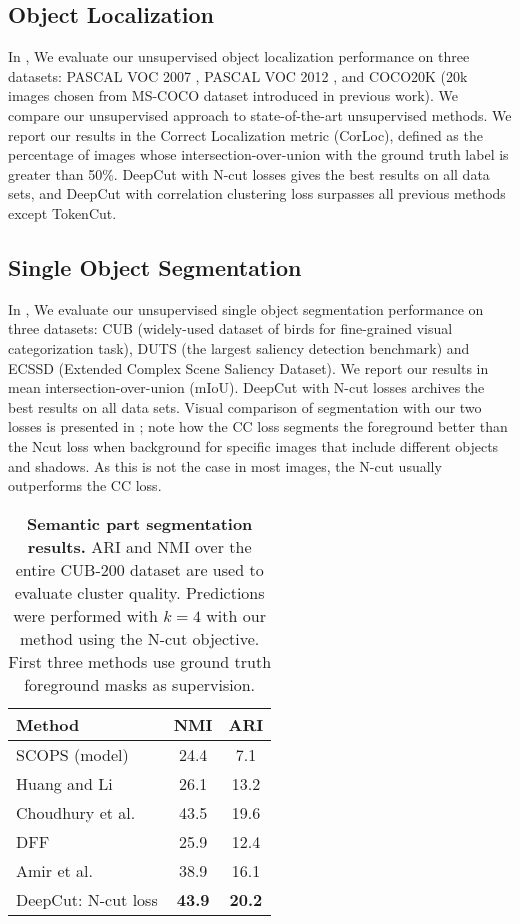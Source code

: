 \documentclass[10pt,twocolumn,letterpaper]{article}
\begin{document}
\subsection{Object Localization}
In  , We evaluate our unsupervised object localization performance on three datasets: PASCAL VOC 2007 \cite{pascal-voc-2007}, PASCAL VOC 2012 \cite{pascal-voc-2012}, 
and COCO20K (20k images chosen from MS-COCO dataset\cite{lin2014microsoft} introduced in previous work\cite{vo2020toward}).
We compare our unsupervised approach to state-of-the-art unsupervised methods.
We report our results in the Correct Localization metric (CorLoc), defined as the percentage of images whose intersection-over-union with the ground truth label is greater than 50\%. 
DeepCut with N-cut losses gives the best results on all data sets, and DeepCut with correlation clustering loss surpasses all previous methods except TokenCut\cite{wang2022self}.

\subsection{Single Object Segmentation}
In , We evaluate our unsupervised single object segmentation performance on three datasets: CUB (widely-used dataset of birds for fine-grained visual categorization task)\cite{cub_2011}, DUTS (the largest saliency detection benchmark)\cite{wang2017} and ECSSD (Extended Complex Scene Saliency Dataset)\cite{yan2013hierarchical}.
We report our results in mean intersection-over-union (mIoU). DeepCut with N-cut losses archives the best results on all data sets. Visual comparison of segmentation with our two losses is presented in ; note how the CC loss segments the foreground better than the Ncut loss when background for specific images that include different objects and shadows. As this is not the case in most images, the N-cut usually outperforms the CC loss.


\begin{table}
  \centering
  \begin{tabular}{@{}lc c@{}}
    \toprule
    Method & NMI  & ARI\\
    \midrule
    SCOPS\cite{hung2019scops} (model) & 24.4 & 7.1\\
    Huang and Li\cite{huang2020interpretable} &  26.1& 13.2 \\
    Choudhury et al.\cite{choudhury2021unsupervised} & 43.5 &   19.6\\
    \midrule
    DFF\cite{collins2018deep} &  25.9 & 12.4\\
    Amir et al.\cite{collins2018deep} &  38.9 & 16.1\\
    \midrule
    DeepCut: N-cut loss&\textbf{43.9} &  \textbf{20.2}\\
    \bottomrule
  \end{tabular}
  \caption{\textbf{Semantic part segmentation results.} ARI and NMI over the entire CUB-200 dataset are used to evaluate cluster quality. Predictions were performed with $k=4$
  with our method using the N-cut objective. First three methods use ground truth foreground masks as supervision.}
  \label{tab:semseg}
\end{table}
\end{document}
